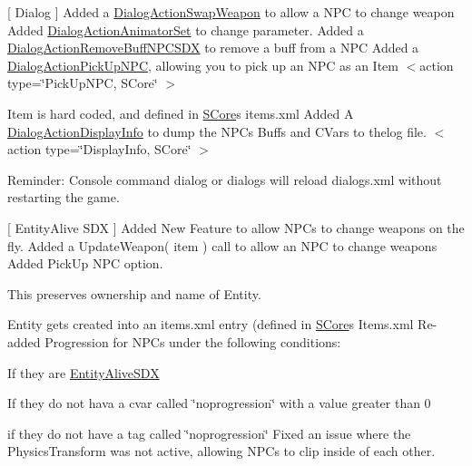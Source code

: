 \mbox{[} Dialog \mbox{]} Added a \mbox{\hyperlink{class_dialog_action_swap_weapon}{Dialog\+Action\+Swap\+Weapon}} to allow a NPC to change weapon \label{md__c___program__files__x86___steam_steamapps_common_7__days__to__die__mods_working_0__s_core__read_me_gunNPCPipeShotgun}%
%
 Added \mbox{\hyperlink{class_dialog_action_animator_set}{Dialog\+Action\+Animator\+Set}} to change parameter. \label{md__c___program__files__x86___steam_steamapps_common_7__days__to__die__mods_working_0__s_core__read_me_PistolUser}%
%
 Added a \mbox{\hyperlink{class_dialog_action_remove_buff_n_p_c_s_d_x}{Dialog\+Action\+Remove\+Buff\+NPCSDX}} to remove a buff from a NPC \label{md__c___program__files__x86___steam_steamapps_common_7__days__to__die__mods_working_0__s_core__read_me_PistolUser}%
%
 Added a \mbox{\hyperlink{class_dialog_action_pick_up_n_p_c}{Dialog\+Action\+Pick\+Up\+NPC}}, allowing you to pick up an NPC as an Item $<$action type=\char`\"{}\+Pick\+Up\+NPC, SCore\char`\"{} $>$
\begin{DoxyItemize}
\item Item is hard coded, and defined in \mbox{\hyperlink{namespace_s_core}{SCore}}\textquotesingle{}s items.\+xml Added A \mbox{\hyperlink{class_dialog_action_display_info}{Dialog\+Action\+Display\+Info}} to dump the NPCs Buffs and CVars to thelog file. $<$action type=\char`\"{}\+Display\+Info, SCore\char`\"{} $>$
\end{DoxyItemize}

Reminder\+: Console command dialog or dialogs will reload dialogs.\+xml without restarting the game.

\mbox{[} Entity\+Alive SDX \mbox{]} Added New Feature to allow NPCs to change weapons on the fly. Added a Update\+Weapon( item ) call to allow an NPC to change weapons Added Pick\+Up NPC option.
\begin{DoxyItemize}
\item This preserves ownership and name of Entity.
\item Entity gets created into an items.\+xml entry (defined in \mbox{\hyperlink{namespace_s_core}{SCore}}\textquotesingle{}s Items.\+xml Re-\/added Progression for NPCs under the following conditions\+:
\item If they are \mbox{\hyperlink{class_entity_alive_s_d_x}{Entity\+Alive\+SDX}}
\item If they do not hava a cvar called \char`\"{}noprogression\char`\"{} with a value greater than 0
\item if they do not have a tag called \char`\"{}noprogression\char`\"{} Fixed an issue where the Physics\+Transform was not active, allowing NPCs to clip inside of each other.
\end{DoxyItemize}


